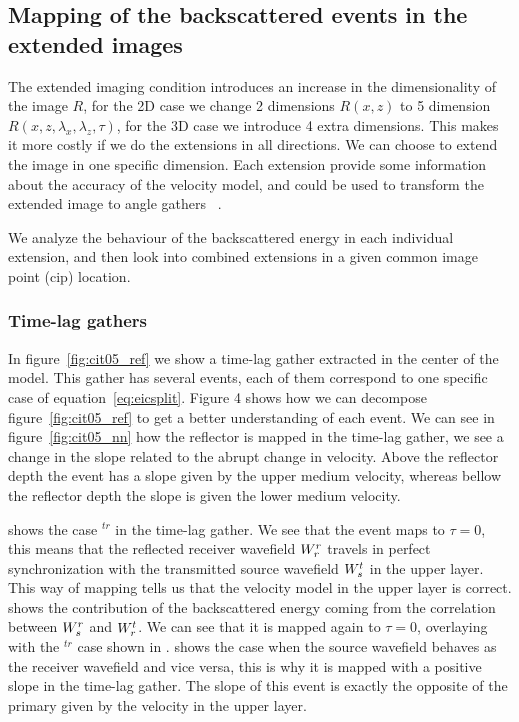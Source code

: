 \subsection{Mapping of the backscattered events in the extended images}

The extended imaging condition introduces an increase in the dimensionality of the image $R$, for the 2D case we change
2 dimensions $R(x,z)$ to 5 dimension $R(x,z,\lambda_x,\lambda_z,\tau)$, for the 3D case we introduce 4 extra dimensions. 
This makes it more costly if we do the extensions in all directions. We can choose to extend the image in one specific dimension.
Each extension provide some information about the accuracy of the velocity model, and could be used to transform the extended
image to angle gathers ~\citep{sava:S209,sava:S131}. 

We analyze the behaviour of the backscattered energy in each individual extension, and then look into combined extensions
in a given common image point (cip) location.

\subsubsection{Time-lag gathers}
In figure~\ref{fig:cit05_ref} we show a time-lag gather extracted in the center of the model. This gather has several events,
each of them correspond to one specific case of equation~\ref{eq:eicsplit}. Figure 4 shows how we can decompose figure~\ref{fig:cit05_ref} to get a better understanding of each event. We can see in figure~\ref{fig:cit05_nn} how the reflector is mapped in the 
time-lag gather, we see a change in the slope related to the abrupt change in velocity. Above the reflector depth the event has
a slope given by the upper medium velocity, whereas bellow the reflector depth the slope is given  the lower medium velocity.

 shows the case $^{tr}$ in the time-lag gather. We see that the event maps to $\tau=0$, this means that the
reflected receiver wavefield ${W_r^r}$ travels in perfect synchronization with the transmitted source wavefield ${W_s^t}$ in the
upper layer. This way of mapping tells us that the velocity model in the upper layer is correct.  shows
the contribution of the backscattered energy coming from the correlation between ${W_s^r}$ and ${W_r^t}$. We can see that it is mapped
again to $\tau=0$, overlaying with the $^{tr}$ case shown in .  shows the case when the source wavefield
behaves as the receiver wavefield and vice versa, this is why it is mapped with a positive slope in the time-lag gather. The slope of
this event is exactly the opposite of the primary given by the velocity in the upper layer.

